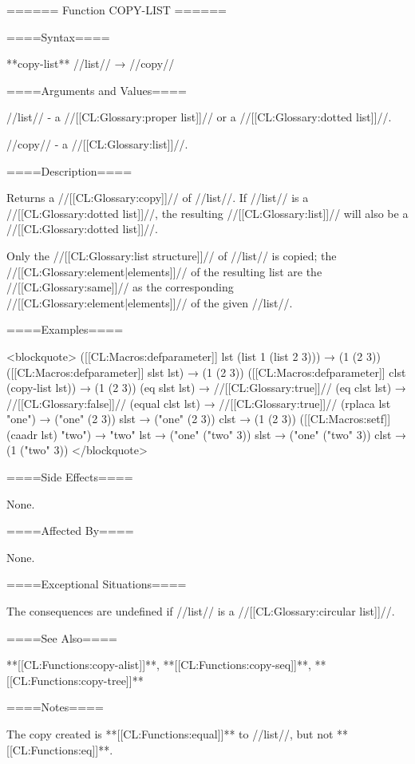====== Function COPY-LIST ======

====Syntax====

**copy-list** //list// → //copy//

====Arguments and Values====

//list// - a //[[CL:Glossary:proper list]]// or a //[[CL:Glossary:dotted list]]//.

//copy// - a //[[CL:Glossary:list]]//.

====Description====

Returns a //[[CL:Glossary:copy]]// of //list//. If //list// is a //[[CL:Glossary:dotted list]]//, the resulting //[[CL:Glossary:list]]// will also be a //[[CL:Glossary:dotted list]]//.

Only the //[[CL:Glossary:list structure]]// of //list// is copied; the //[[CL:Glossary:element|elements]]// of the resulting list are the //[[CL:Glossary:same]]// as the corresponding //[[CL:Glossary:element|elements]]// of the given //list//.

====Examples====

<blockquote> ([[CL:Macros:defparameter]] lst (list 1 (list 2 3))) → (1 (2 3)) ([[CL:Macros:defparameter]] slst lst) → (1 (2 3)) ([[CL:Macros:defparameter]] clst (copy-list lst)) → (1 (2 3)) (eq slst lst) → //[[CL:Glossary:true]]// (eq clst lst) → //[[CL:Glossary:false]]// (equal clst lst) → //[[CL:Glossary:true]]// (rplaca lst "one") → ("one" (2 3)) slst → ("one" (2 3)) clst → (1 (2 3)) ([[CL:Macros:setf]] (caadr lst) "two") → "two" lst → ("one" ("two" 3)) slst → ("one" ("two" 3)) clst → (1 ("two" 3)) </blockquote>

====Side Effects====

None.

====Affected By====

None.

====Exceptional Situations====

The consequences are undefined if //list// is a //[[CL:Glossary:circular list]]//.

====See Also====

**[[CL:Functions:copy-alist]]**, **[[CL:Functions:copy-seq]]**, **[[CL:Functions:copy-tree]]**

====Notes====

The copy created is **[[CL:Functions:equal]]** to //list//, but not **[[CL:Functions:eq]]**.

